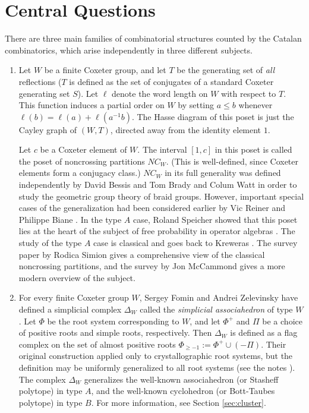 \section{Central Questions}
\label{sec:central}

There are three main families of combinatorial structures counted by
the Catalan combinatorics, which arise independently in three different
subjects.

\begin{enumerate}
\item Let $W$ be a finite Coxeter group, and let $T$ be the generating
set of \emph{all} reflections ($T$ is defined as the set of conjugates of
a standard Coxeter generating set $S$). Let $\ell$ denote the word length
on $W$ with respect to $T$. This function induces a partial order on $W$
by setting $a\leq b$ whenever $\ell(b)=\ell(a)+\ell(a^{-1}b)$. The Hasse
diagram of this poset is just the Cayley graph of $(W,T)$, directed away
from the identity element $1$.

Let $c$ be a Coxeter element of $W$. The interval $[1,c]$ in
this poset is called the poset of noncrossing partitions
$NC_W$. (This is well-defined, since Coxeter elements form a conjugacy
class.) $NC_W$ in its full generality was defined independently
by David Bessis \cite{bessis:dual} and Tom Brady and Colum Watt
\cite{brady,brady-watt:kpi1} in order to study the geometric group theory
of braid groups. However, important special cases of the generalization
had been considered earlier by Vic Reiner \cite{reiner} and Philippe Biane
\cite{biane}. In the type $A$ case, Roland Speicher showed that this poset
lies at the heart of the subject of free probability in operator algebras
\cite{speicher:survey}. The study of the type $A$ case is classical and
goes back to Kreweras \cite{kreweras}. The survey paper \cite{simion}
by Rodica Simion gives a comprehensive view of the classical noncrossing
partitions, and the survey \cite{mccammond:noncrossing} by Jon McCammond
gives a more modern overview of the subject.

\item For every finite Coxeter group $W$, Sergey Fomin and Andrei
Zelevinsky have defined a simplicial complex $\Delta_W$ called the
\emph{simplicial associahedron} of type $W$. Let $\Phi$ be the root
system corresponding to $W$, and let $\Phi^+$ and $\Pi$ be a choice
of positive roots and simple roots, respectively. Then $\Delta_W$ is
defined as a flag complex on the set of  almost positive roots
$\Phi_{\geq -1}:= \Phi^+ \cup (-\Pi)$. Their original construction
\cite{fomin-zelevinsky:ysystems} applied only to crystallographic
root systems, but the definition may be uniformly generalized to all
root systems (see the notes \cite{fomin-reading:survey}). The complex
$\Delta_W$ generalizes the well-known associahedron (or Stasheff polytope)
in type $A$, and the well-known cyclohedron (or Bott-Taubes polytope)
in type $B$. For more information, see Section \ref{sec:cluster}.


\end{enumerate}
